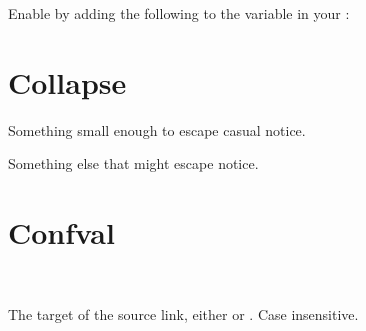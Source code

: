 \documentclass[letterpaper,10pt,english]{sphinxmanual}
\begin{document}
\label{\detokenize{installation:extensions-5}}

Enable  by adding the following
to the  variable in your :

\begin{sphinxVerbatim}[commandchars=\\\{\}]
  \PYG{p}{[}
    \PYG{p}{]}
\end{sphinxVerbatim}



\chapter{Collapse}
\label{\detokenize{collapse:collapse}}\label{\detokenize{collapse::doc}}
Something small enough to escape casual notice.

Something else that might escape notice.


\chapter{Confval}
\label{\detokenize{confval:confval}}\label{\detokenize{confval::doc}}

\begin{fulllineitems}
\label{\detokenize{confval:confval-source_link_target}}~
\vspace{-45px}

\begin{DUlineblock}{0em}
\item[]  
\item[]  
\item[]  
\end{DUlineblock}

\vspace{-25px}

The target of the source link, either  or .
Case insensitive.

\end{fulllineitems}
\end{document}
